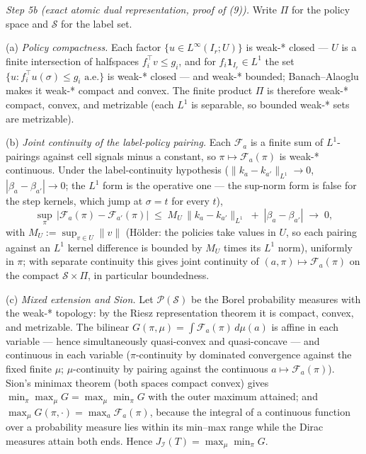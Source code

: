 \documentclass[10pt,article]{article}
\begin{document}
\emph{Step 5b (exact atomic dual representation, proof of (9)).} Write
\(\Pi\) for the policy space and \(\mathscr S\) for the label set.

(a) \emph{Policy compactness.} Each factor
\(\{u \in L^\infty(I_r; U)\}\) is weak-* closed --- \(U\) is a finite
intersection of halfspaces \(f_i^\top v \le g_i\), and for
\(f_i \mathbf 1_{I_r} \in L^1\) the set \(\{u : f_i^\top u(\sigma)
\le g_i \text{ a.e.}\}\) is weak-* closed --- and weak-* bounded;
Banach--Alaoglu makes it weak-* compact and convex. The finite product
\(\Pi\) is therefore weak-* compact, convex, and metrizable (each
\(L^1\) is separable, so bounded weak-* sets are metrizable).

(b) \emph{Joint continuity of the label-policy pairing.} Each
\(\mathcal F_a\) is a finite sum of \(L^1\)-pairings against cell
signals minus a constant, so \(\pi \mapsto \mathcal F_a(\pi)\) is weak-*
continuous. Under the label-continuity hypothesis
(\(\|k_a - k_{a'}\|_{L^1} \to 0\), \(|\beta_a - \beta_{a'}| \to 0\);
the \(L^1\) form is the operative one --- the sup-norm form is false for
the step kernels, which jump at \(\sigma = t\) for every \(t\)),
\[
\sup_\pi \, |\mathcal F_a(\pi) - \mathcal F_{a'}(\pi)|
\;\le\; M_U \, \|k_a - k_{a'}\|_{L^1}
\;+\; |\beta_a - \beta_{a'}| \;\to\; 0,
\]
with \(M_U := \sup_{v \in U} \|v\|\) (H\"older: the policies take
values in \(U\), so each pairing against an \(L^1\) kernel difference
is bounded by \(M_U\) times its \(L^1\) norm),
uniformly in \(\pi\); with separate continuity this gives joint
continuity of \((a, \pi) \mapsto \mathcal F_a(\pi)\) on the compact
\(\mathscr S \times \Pi\), in particular boundedness.

(c) \emph{Mixed extension and Sion.} Let
\(\mathcal P(\mathscr S)\) be the Borel probability measures with the
weak-* topology: by the Riesz representation theorem it is compact,
convex, and metrizable. The bilinear
\(G(\pi, \mu) = \int \mathcal F_a(\pi)\,d\mu(a)\) is affine in
each variable --- hence simultaneously quasi-convex and quasi-concave ---
and continuous in each variable (\(\pi\)-continuity by dominated
convergence against the fixed finite \(\mu\); \(\mu\)-continuity by
pairing against the continuous \(a \mapsto \mathcal F_a(\pi)\)).
Sion's minimax theorem (both spaces compact convex) gives
\(\min_\pi \max_\mu G = \max_\mu \min_\pi G\) with the outer
maximum attained; and \(\max_\mu G(\pi, \cdot) = \max_a
\mathcal F_a(\pi)\), because the integral of a continuous function
over a probability measure lies within its min--max range while the Dirac
measures attain both ends. Hence
\(J_{\mathcal I}(T) = \max_\mu \min_\pi G\).
\end{document}
